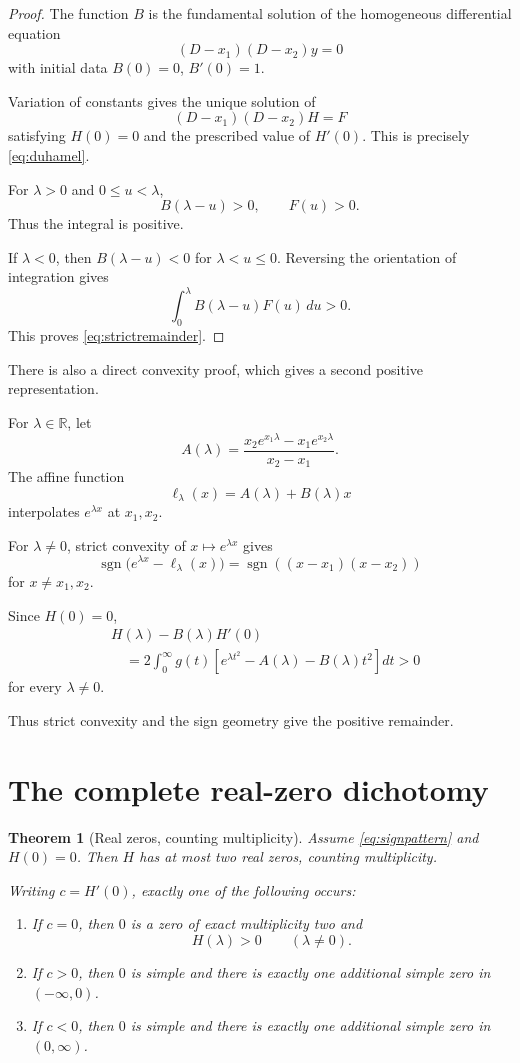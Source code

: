 \documentclass[11pt]{article}
\newtheorem{theorem}{Theorem}
\begin{document}
\begin{proof}
The function $B$ is the fundamental solution
of the homogeneous differential equation
\[
(D-x_1)(D-x_2)y=0
\]
with initial data $B(0)=0$, $B'(0)=1$.

Variation of constants gives the unique
solution of
\[
(D-x_1)(D-x_2)H=F
\]
satisfying $H(0)=0$ and the prescribed
value of $H'(0)$. This is precisely
\eqref{eq:duhamel}.

For $\lambda>0$ and $0\le u<\lambda$,
\[
B(\lambda-u)>0,\qquad F(u)>0.
\]
Thus the integral is positive.

If $\lambda<0$, then $B(\lambda-u)<0$
for $\lambda<u\le0$. Reversing the orientation
of integration gives
\[
\int_0^\lambda B(\lambda-u)F(u)\,du>0.
\]
This proves \eqref{eq:strictremainder}.
\end{proof}

There is also a direct convexity proof,
which gives a second positive representation.

For $\lambda\in\mathbb R$, let
\[
A(\lambda)=
\frac{x_2e^{x_1\lambda}
      -x_1e^{x_2\lambda}}{x_2-x_1}.
\]
The affine function
\[
\ell_\lambda(x)=A(\lambda)+B(\lambda)x
\]
interpolates $e^{\lambda x}$ at $x_1,x_2$.

For $\lambda\ne0$, strict convexity of
$x\mapsto e^{\lambda x}$ gives
\[
\operatorname{sgn}
\bigl(e^{\lambda x}-\ell_\lambda(x)\bigr)
=
\operatorname{sgn}((x-x_1)(x-x_2))
\]
for $x\ne x_1,x_2$.

Since $H(0)=0$,
\begin{equation}
\boxed{
\begin{aligned}
&H(\lambda)-B(\lambda)H'(0)\\
&\quad=
2\int_0^\infty g(t)
\left[
e^{\lambda t^2}
-A(\lambda)-B(\lambda)t^2
\right]dt>0
\end{aligned}
}
\label{eq:convexrepresentation}
\end{equation}
for every $\lambda\ne0$.

Thus strict convexity and the sign geometry give the positive remainder.

\section{The complete real-zero dichotomy}

\begin{theorem}[Real zeros, counting multiplicity]
\label{thm:zeros}
Assume \eqref{eq:signpattern} and $H(0)=0$.
Then $H$ has at most two real zeros,
counting multiplicity.

Writing $c=H'(0)$, exactly one of the
following occurs:
\begin{enumerate}
\item If $c=0$, then $0$ is a zero of
exact multiplicity two and
\[
H(\lambda)>0\qquad(\lambda\ne0).
\]
\item If $c>0$, then $0$ is simple and
there is exactly one additional simple
zero in $(-\infty,0)$.
\item If $c<0$, then $0$ is simple and
there is exactly one additional simple
zero in $(0,\infty)$.
\end{enumerate}
\end{theorem}
\end{document}
